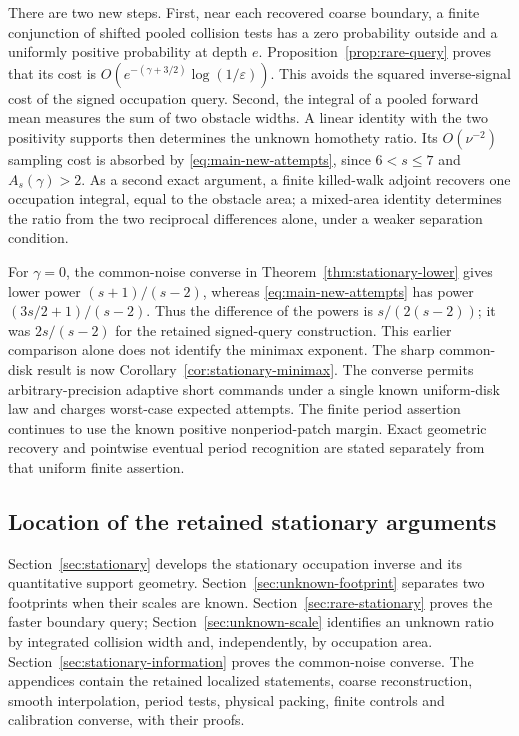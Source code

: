 There are two new steps. First, near each recovered coarse boundary,
a finite conjunction of shifted pooled collision tests has a zero
probability outside and a uniformly positive probability at depth $e$.
Proposition~\ref{prop:rare-query} proves that its cost is
$O(e^{-(\gamma+3/2)}\log(1/\varepsilon))$. This avoids the squared
inverse-signal cost of the signed occupation query. Second, the integral of a pooled forward mean measures the sum of two
obstacle widths. A linear identity with the two positivity supports
then determines the unknown homothety ratio. Its $O(\nu^{-2})$
sampling cost is absorbed
by \eqref{eq:main-new-attempts}, since $6<s\le7$ and
$A_s(\gamma)>2$. As a second exact argument, a finite killed-walk
adjoint recovers one occupation integral, equal to the obstacle area;
a mixed-area identity determines the ratio from the two reciprocal
differences alone, under a weaker separation condition.

For $\gamma=0$, the common-noise converse in
Theorem~\ref{thm:stationary-lower} gives lower power $(s+1)/(s-2)$,
whereas \eqref{eq:main-new-attempts} has power $(3s/2+1)/(s-2)$.
Thus the difference of the powers is $s/(2(s-2))$; it was $2s/(s-2)$
for the retained signed-query construction. This earlier comparison alone does not identify the minimax exponent.
The sharp common-disk result is now Corollary~\ref{cor:stationary-minimax}. The converse permits arbitrary-precision
adaptive short commands under a single known uniform-disk law and
charges worst-case expected attempts. The finite period assertion
continues to use the known positive nonperiod-patch margin. Exact
geometric recovery and pointwise eventual period recognition are
stated separately from that uniform finite assertion.

\subsection{Location of the retained stationary arguments}
Section~\ref{sec:stationary} develops the stationary occupation inverse
and its quantitative support geometry. Section~\ref{sec:unknown-footprint}
separates two footprints when their scales are known.
Section~\ref{sec:rare-stationary} proves the faster boundary query;
Section~\ref{sec:unknown-scale} identifies an unknown ratio by integrated
collision width and, independently, by occupation area.
Section~\ref{sec:stationary-information} proves the common-noise
converse. The appendices contain the retained localized statements,
coarse reconstruction, smooth interpolation, period tests, physical
packing, finite controls and calibration converse, with their proofs.
